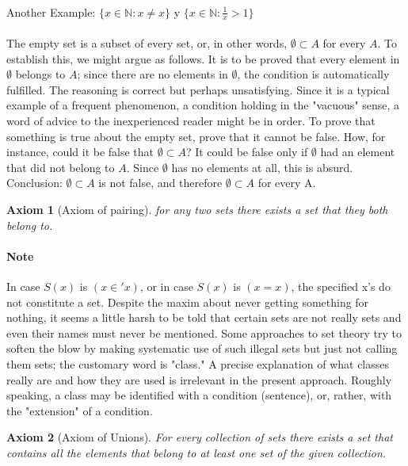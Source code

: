 \documentclass{article}
\newtheorem{axiom}{Axiom}[section]
\begin{document}
\paragraph{}Another Example: $\{x\in \mathbb{N}: x \neq x\}$ y $\{x \in \mathbb{N}: \frac{1}{x} > 1\}$

\paragraph{}The empty set is a subset of every set, or, in other words, $\emptyset \subset A$ for every $A$. To establish this, we might argue as follows. It is to be proved that every element in $\emptyset$ belongs to $A$; since there are no elements in $\emptyset$, the condition is automatically fulfilled. The reasoning is correct but perhaps unsatisfying. Since it is a typical example of a frequent phenomenon, a condition holding in the "vacuous" sense, a word of advice to the inexperienced reader might be in order. To prove that something is true about the empty set, prove that it cannot be false. How, for instance, could it be false that $\emptyset \subset A$? It could be false only if $\emptyset$ had an element that did not belong to $A$. Since $\emptyset$ has no elements at all, this is absurd. Conclusion: $\emptyset \subset A$ is not false, and therefore $\emptyset \subset A$ for every A.
\begin{axiom}[Axiom of pairing]
	for any two sets there exists a set that they both belong to.
\end{axiom}
\paragraph{Note} In case $S(x)$ is $(x \in' x)$, or in case $S(x)$ is $(x = x)$, the specified x's do not constitute a set. Despite the maxim about never getting something for nothing, it seems a little harsh to be told that certain sets are not really sets and even their names must never be mentioned. Some approaches to set theory try to soften the blow by making systematic use of such illegal sets but just not calling them sets; the customary word is "class." A precise explanation of what classes really are and how they are used is irrelevant in the present approach. Roughly speaking, a class may be identified with a condition (sentence), or, rather, with the "extension" of a condition.

\begin{axiom}[Axiom of Unions]
	For every collection of sets there exists a set that contains all the elements that belong to at least one set of the given collection.
\end{axiom}
\end{document}
